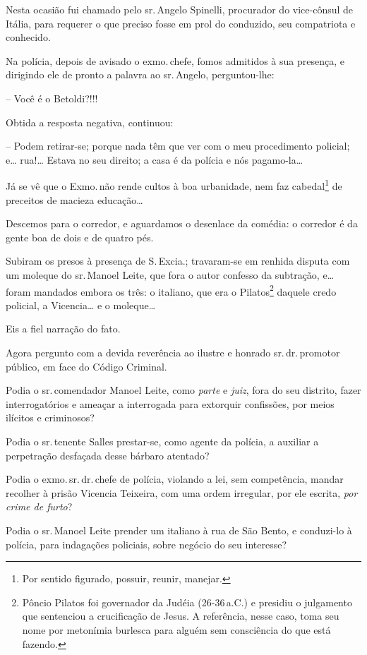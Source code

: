 Nesta ocasião fui chamado pelo sr.\,Angelo Spinelli, procurador do
vice-cônsul de Itália, para requerer o que preciso fosse em prol do
conduzido, seu compatriota e conhecido.

Na polícia, depois de avisado o exmo.\,chefe, fomos admitidos à sua
presença, e dirigindo ele de pronto a palavra ao sr.\,Angelo,
perguntou-lhe:

-- Você é o Betoldi?!!!

Obtida a resposta negativa, continuou:

-- Podem retirar-se; porque nada têm que ver com o meu procedimento
policial; e\ldots{} rua!\ldots{} Estava no seu direito; a casa é da polícia e nós
pagamo-la\ldots{}

Já se vê que o Exmo.\,não rende cultos à boa urbanidade, nem faz
cabedal\footnote{ Por sentido figurado, possuir, reunir, manejar.} de
preceitos de macieza educação\ldots{}

Descemos para o corredor, e aguardamos o desenlace da comédia: o
corredor é da gente boa de dois e de quatro pés.

Subiram os presos à presença de S.\,Excia.; travaram-se em renhida
disputa com um moleque do sr.\,Manoel Leite, que fora o autor confesso da
subtração, e\ldots{} foram mandados embora os três: o italiano, que era o
Pilatos\footnote{ Pôncio Pilatos foi governador da Judéia (26-36\,a.C.) e
  presidiu o julgamento que sentenciou a crucificação de Jesus. A
  referência, nesse caso, toma seu nome por metonímia burlesca para
  alguém sem consciência do que está fazendo.} daquele credo policial, a
Vicencia\ldots{} e o moleque\ldots{}

Eis a fiel narração do fato.

Agora pergunto com a devida reverência ao ilustre e honrado sr.\,dr.\,promotor público, em face do Código Criminal.

Podia o sr.\,comendador Manoel Leite, como \emph{parte} e \emph{juiz},
fora do seu distrito, fazer interrogatórios e ameaçar a interrogada para
extorquir confissões, por meios ilícitos e criminosos?

Podia o sr.\,tenente Salles prestar-se, como agente da polícia, a
auxiliar a perpetração desfaçada desse bárbaro atentado?

Podia o exmo.\,sr.\,dr.\,chefe de polícia, violando a lei, sem competência,
mandar recolher à prisão Vicencia Teixeira, com uma ordem irregular, por
ele escrita, \emph{por crime de furto}?

Podia o sr.\,Manoel Leite prender um italiano à rua de São Bento, e
conduzi-lo à polícia, para indagações policiais, sobre negócio do seu
interesse?

